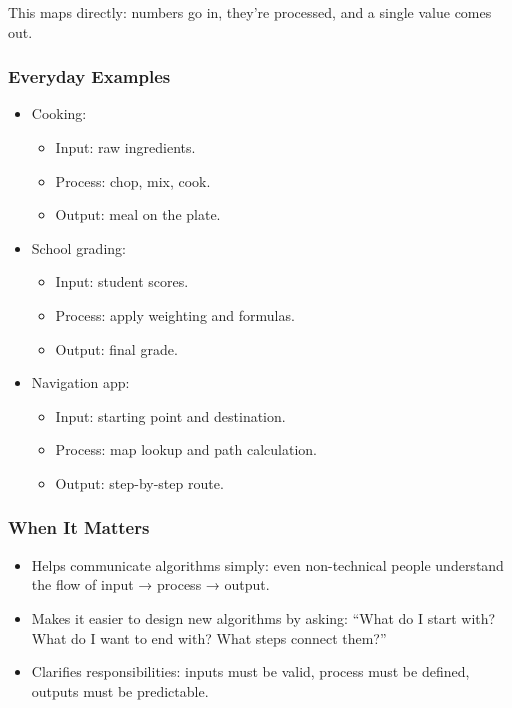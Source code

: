 \documentclass[
  letterpaper,
  DIV=11,
  numbers=noendperiod]{scrreprt}
\providecommand{\tightlist}{%
  \setlength{\itemsep}{0pt}\setlength{\parskip}{0pt}}
\begin{document}
This maps directly: numbers go in, they're processed, and a single value
comes out.

\subsubsection{Everyday Examples}\label{everyday-examples-17}

\begin{itemize}
\item
  Cooking:

  \begin{itemize}
  \tightlist
  \item
    Input: raw ingredients.
  \item
    Process: chop, mix, cook.
  \item
    Output: meal on the plate.
  \end{itemize}
\item
  School grading:

  \begin{itemize}
  \tightlist
  \item
    Input: student scores.
  \item
    Process: apply weighting and formulas.
  \item
    Output: final grade.
  \end{itemize}
\item
  Navigation app:

  \begin{itemize}
  \tightlist
  \item
    Input: starting point and destination.
  \item
    Process: map lookup and path calculation.
  \item
    Output: step-by-step route.
  \end{itemize}
\end{itemize}

\subsubsection{When It Matters}\label{when-it-matters-16}

\begin{itemize}
\tightlist
\item
  Helps communicate algorithms simply: even non-technical people
  understand the flow of input → process → output.
\item
  Makes it easier to design new algorithms by asking: ``What do I start
  with? What do I want to end with? What steps connect them?''
\item
  Clarifies responsibilities: inputs must be valid, process must be
  defined, outputs must be predictable.
\end{itemize}
\end{document}
